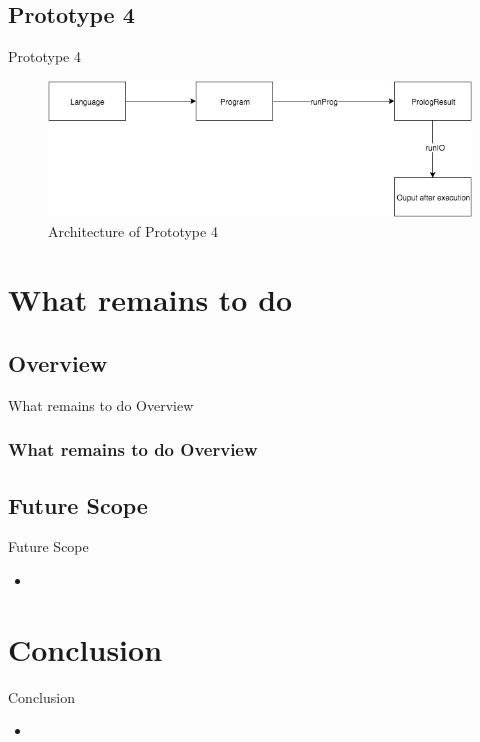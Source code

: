 \documentclass[hideothersubsections]{beamer}
\begin{document}
\subsection{Prototype 4}

\begin{frame}{Prototype 4}
\begin{figure}[H]
  \includegraphics[width=1\textwidth]{Prototype-4-architecture.jpeg}
  \caption{Architecture of Prototype 4}
  \label{fig:proto1-arch}
\end{figure}
\end{frame}


\section{What remains to do}

\subsection{Overview}
\begin{frame}{What remains to do Overview}
	
	\frametitle{What remains to do Overview}
	
\end{frame}

\subsection{Future Scope}
\begin{frame}{Future Scope}
\begin{itemize}
\item
\end{itemize}

\end{frame}

\section{Conclusion}
\begin{frame}{Conclusion}
\begin{itemize}
\item
\end{itemize}

\end{frame}
\end{document}
